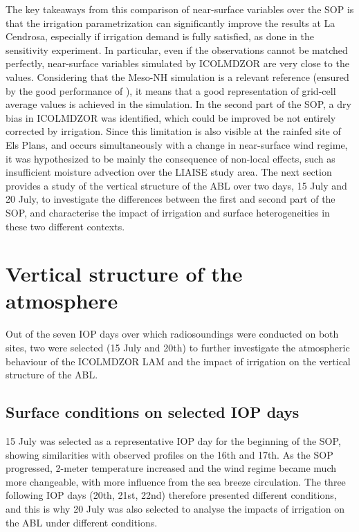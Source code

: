 The key takeaways from this comparison of near-surface variables over the SOP is that the irrigation parametrization can significantly improve the results at La Cendrosa, especially if irrigation demand is fully satisfied, as done in the \irrboost sensitivity experiment.
In particular, even if the observations cannot be matched perfectly, near-surface variables simulated by ICOLMDZOR are very close to the \mesomean values. Considering that the Meso-NH simulation is a relevant reference (ensured by the good performance of \mesoexact), it means that a good representation of grid-cell average values is achieved in the \irrboost simulation. 
In the second part of the SOP, a dry bias in ICOLMDZOR was identified, which could be improved be not entirely corrected by irrigation. Since this limitation is also visible at the rainfed site of Els Plans, and occurs simultaneously with a change in near-surface wind regime, it was hypothesized to be mainly the consequence of non-local effects, such as insufficient moisture advection over the LIAISE study area. The next section provides a study of the vertical structure of the ABL over two days, 15 July and 20 July, to investigate the differences between the first and second part of the SOP, and characterise the impact of irrigation and surface heterogeneities in these two different contexts.
\clearpage %

\section{Vertical structure of the atmosphere}
\label{sec:iop}

Out of the seven IOP days over which radiosoundings were conducted on both sites, two were selected (15 July and 20th) to further investigate the atmospheric behaviour of the ICOLMDZOR LAM and the impact of irrigation on the vertical structure of the ABL.

\subsection{Surface conditions on selected IOP days}

15 July was selected as a representative IOP day for the beginning of the SOP, showing similarities with observed profiles on the 16th and 17th. As the SOP progressed, 2-meter temperature increased and the wind regime became much more changeable, with more influence from the sea breeze circulation.
The three following IOP days (20th, 21st, 22nd) therefore presented different conditions, and this is why 20 July was also selected to analyse the impacts of irrigation on the ABL under different conditions.

